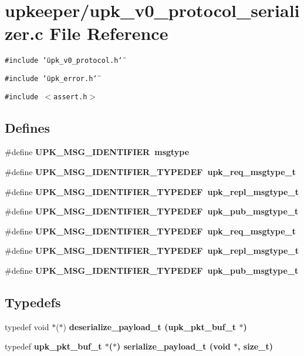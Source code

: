 \section{upkeeper/upk\_\-v0\_\-protocol\_\-serializer.c File Reference}
\label{upk__v0__protocol__serializer_8c}
{\tt \#include \char`\"{}upk\_\-v0\_\-protocol.h\char`\"{}}\par
{\tt \#include \char`\"{}upk\_\-error.h\char`\"{}}\par
{\tt \#include $<$assert.h$>$}\par
\subsection*{Defines}
\begin{CompactItemize}
\item 
\#define \bf{UPK\_\-MSG\_\-IDENTIFIER}~msgtype
\item 
\#define \bf{UPK\_\-MSG\_\-IDENTIFIER\_\-TYPEDEF}~\bf{upk\_\-req\_\-msgtype\_\-t}
\item 
\#define \bf{UPK\_\-MSG\_\-IDENTIFIER\_\-TYPEDEF}~\bf{upk\_\-repl\_\-msgtype\_\-t}
\item 
\#define \bf{UPK\_\-MSG\_\-IDENTIFIER\_\-TYPEDEF}~\bf{upk\_\-pub\_\-msgtype\_\-t}
\item 
\#define \bf{UPK\_\-MSG\_\-IDENTIFIER\_\-TYPEDEF}~\bf{upk\_\-req\_\-msgtype\_\-t}
\item 
\#define \bf{UPK\_\-MSG\_\-IDENTIFIER\_\-TYPEDEF}~\bf{upk\_\-repl\_\-msgtype\_\-t}
\item 
\#define \bf{UPK\_\-MSG\_\-IDENTIFIER\_\-TYPEDEF}~\bf{upk\_\-pub\_\-msgtype\_\-t}
\end{CompactItemize}
\subsection*{Typedefs}
\begin{CompactItemize}
\item 
typedef void $\ast$($\ast$) \bf{deserialize\_\-payload\_\-t} (\bf{upk\_\-pkt\_\-buf\_\-t} $\ast$)
\item 
typedef \bf{upk\_\-pkt\_\-buf\_\-t} $\ast$($\ast$) \bf{serialize\_\-payload\_\-t} (void $\ast$, size\_\-t)
\end{CompactItemize}
